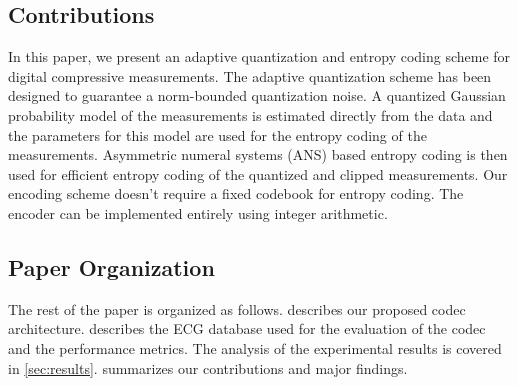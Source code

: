 \subsection{Contributions}
In this paper, we present an adaptive quantization and
entropy coding scheme for digital compressive measurements.
The adaptive quantization scheme has been designed
to guarantee a norm-bounded quantization noise.
A quantized Gaussian probability model of the measurements
is estimated directly from the data
and the parameters for this model are used
for the entropy coding of the measurements.  
Asymmetric numeral systems (ANS) based
entropy coding is then used for efficient entropy coding
of the quantized and clipped measurements.
Our encoding scheme doesn't require a fixed codebook
for entropy coding.
The encoder can be implemented entirely using integer arithmetic.

\subsection{Paper Organization}
The rest of the paper is organized as follows.
 describes our proposed codec architecture.
 describes the ECG database
used for the evaluation of the codec and the
performance metrics.
The analysis of the experimental results is covered in \cref{sec:results}.
 summarizes our contributions and major findings.

